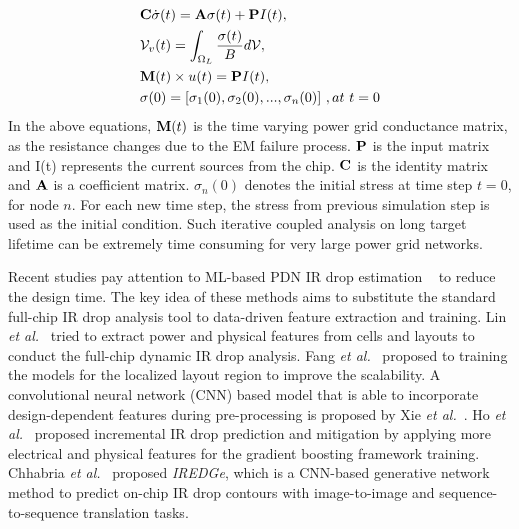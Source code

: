 \begin{align}
	\label{eq:em}
	\begin{split}
		&{\bf C} \dot{\sigma}(t)  = {\bf A} \sigma(t) + {\bf P}I(t),  \\
		&\mathcal{V}_v(t)  = \int_{\Omega_L}\frac{\sigma(t)}{B}d\mathcal{V},  \\ 
		&{\bf M}(t) \times u(t)  = {\bf P} I(t), \\
		&{\bf \sigma}(0)  = [\sigma_1(0), \sigma_2(0), ..., \sigma_n(0)] \,\, ,at \,\, t = 0 
	\end{split}
\end{align}
In the above equations, ${\bf M}(t)$ is the time varying power grid conductance matrix, as the resistance changes due to the EM failure process. ${{\bf P}}$ is the input matrix and I(t) represents the current sources from the chip. ${{\bf C}}$ is the identity matrix and ${{\bf A}}$ is a coefficient matrix. $\sigma_{n}(0)$ denotes the initial stress at time step $t = 0$, for node $n$. For each new time step, the stress from previous simulation step is used as the initial condition. Such iterative coupled analysis on long target lifetime can be extremely time consuming for very large power grid networks.






Recent studies pay attention to ML-based PDN IR drop estimation ~\cite{LinFang:2018vts,Fang:2018dynireco,HoKahng:ICCAD'19,Xie:2020powernet,Sachin:ASPDAC'21} to reduce the design time. 
The key idea of these methods aims to substitute the standard full-chip IR drop analysis tool to data-driven feature extraction and training. Lin {\it et al.}~\cite{LinFang:2018vts} tried to extract power and physical features from cells and layouts to conduct the full-chip dynamic IR drop analysis. Fang {\it et al.}~\cite{Fang:2018dynireco} proposed to training the models for the localized layout region to improve the scalability.  A convolutional neural network (CNN) based model that is able to incorporate design-dependent features during pre-processing is proposed by Xie {\it et al.}~\cite{Xie:2020powernet}. Ho {\it et al.}~\cite{HoKahng:ICCAD'19} proposed incremental IR drop prediction and mitigation by applying more electrical and physical features for the gradient boosting framework training. Chhabria {\it et al.}~\cite{Sachin:ASPDAC'21} proposed {\it IREDGe}, which is a CNN-based generative network method to predict on-chip IR drop contours with image-to-image and sequence-to-sequence translation tasks. 


